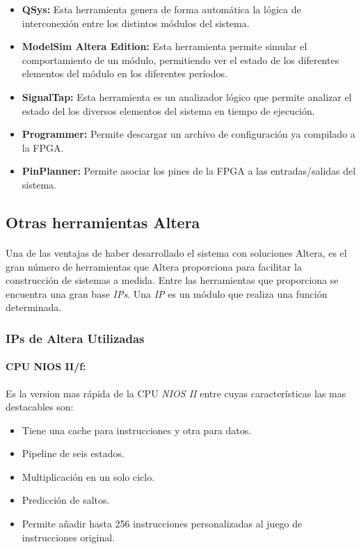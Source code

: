 \documentclass[a4paper,12pt,titlepage,final]{book}
\begin{document}
\begin{itemize}
\item \textbf{QSys:} Esta herramienta genera de forma automática la lógica de interconexión entre los distintos módulos del sistema.

\item \textbf{ModelSim Altera Edition:} Esta herramienta permite simular el comportamiento de un módulo, permitiendo ver el estado de los diferentes elementos del módulo en los diferentes períodos.

\item \textbf{SignalTap:} Esta herramienta es un analizador lógico que permite analizar el estado del los diversos elementos del sistema en tiempo de ejecución.

\item \textbf{Programmer:} Permite descargar un archivo de configuración ya compilado a la FPGA.

\item \textbf{PinPlanner:} Permite asociar los pines de la FPGA a las entradas/salidas del sistema.
\end{itemize}

\subsection{Otras herramientas Altera }

\paragraph{}
Una de las ventajas de haber desarrollado el sistema con soluciones Altera, es el gran número de herramientas que Altera proporciona para facilitar la construcción de sistemas a medida. Entre las herramientas que proporciona se encuentra una gran base \textit{IPs}. Una \textit{IP} es un módulo que realiza una función determinada.

\subsubsection{IPs de Altera Utilizadas}

\paragraph{CPU NIOS II/f:}
Es la version mas rápida de la CPU \textit{NIOS II} entre cuyas características las mas destacables son:

\begin{itemize}
\item Tiene una cache para instrucciones y otra para datos.

\item Pipeline de seis estados.

\item Multiplicación en un solo ciclo.

\item Predicción de saltos.

\item Permite añadir hasta 256 instrucciones personalizadas al juego de instrucciones original.
\end{itemize}
\end{document}
